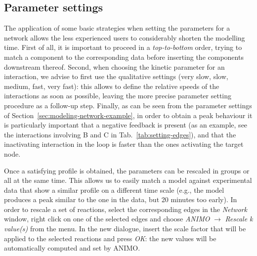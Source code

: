 \documentclass{article}
\def\tas{Timed Automata}
\begin{document}
\subsection{Parameter settings}\label{subsec:param-settings}
The application of some basic strategies when setting the parameters for a network allows
the less experienced users to considerably shorten the modelling time.
First of all, it is important to proceed in a \emph{top-to-bottom} order, trying to match
a component to the corresponding data before inserting the components downstream thereof.
Second, when choosing the kinetic parameter for an interaction, we advise to first use the qualitative settings (very slow, slow, medium, fast, very fast):
this allows to define the relative speeds of the interactions as soon as possible,
leaving the more precise parameter setting procedure as a follow-up step. Finally, as can be seen from
the parameter settings of Section~\ref{sec:modeling-network-example}, in order to obtain a peak
behaviour it is particularly important that
a negative feedback is present (as an example, see the interactions involving B and C in Tab.~\ref{tab:setting-edges}),
and that the inactivating interaction in the loop is faster than the ones activating the target node.

Once a satisfying profile is obtained, the parameters can be rescaled in groups or all at the same time.
This allows us to easily match a model against experimental data that show a similar profile on a different
time scale (e.g., the model produces a peak similar to the one in the data, but 20 minutes too early).
In order to rescale a set of reactions, select the corresponding edges in the \emph{Network} window,
right click on one of the selected edges and choose \emph{ANIMO} $\rightarrow$ \emph{Rescale k value(s)}
from the menu. In the new dialogue, insert the scale factor that will be applied to the selected reactions and
press \emph{OK}: the new values will be automatically computed and set by ANIMO.

\end{document}
